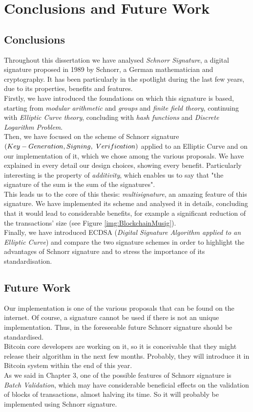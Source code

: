 \chapter{Conclusions and Future Work}
\label{capitolo6}


\section{Conclusions}
Throughout this dissertation we have analysed \textit{Schnorr Signature}, a digital signature proposed in 1989 by Schnorr, a German mathematician and cryptography. It has been particularly in the spotlight during the last few years, due to its properties, benefits and features.\\
Firstly, we have introduced the foundations on which this signature is based, starting from \textit{modular arithmetic} and \textit{groups} and \textit{finite field theory}, continuing with \textit{Elliptic Curve theory}, concluding with \textit{hash functions} and \textit{Discrete Logarithm Problem}.\\
Then, we have focused on the scheme of Schnorr signature $(Key-Generation,\\ Signing,\ Verification)$ applied to an Elliptic Curve and on our implementation of it, which we chose among the various proposals. We have explained in every detail our design choices, showing every benefit. Particularly interesting is the property of \textit{additivity}, which enables us to say that "the signature of the sum is the sum of the signatures".\\
This leads us to the core of this thesis: \textit{multisignature}, an amazing feature of this signature. We have implemented its scheme and analysed it in details, concluding that it would lead to considerable benefits, for example a significant reduction of the transactions' size (see Figure \eqref{img:BlockchainMusig}).\\
Finally, we have introduced ECDSA (\textit{Digital Signature Algorithm applied to an Elliptic Curve}) and compare the two signature schemes in order to highlight the advantages of Schnorr signature and to stress the importance of its standardisation.



\section{Future Work}
Our implementation is one of the various proposals that can be found on the internet. Of course, a signature cannot be used if there is not an unique implementation. Thus, in the foreseeable future Schnorr signature should be standardised.\\
Bitcoin core developers are working on it, so it is conceivable that they might release their algorithm in the next few months. Probably, they will introduce it in Bitcoin system within the end of this year.\\
As we said in Chapter 3, one of the possible features of Schnorr signature is \textit{Batch Validation}, which may have considerable beneficial effects on the validation of blocks of transactions, almost halving its time. So it will probably be implemented using Schnorr signature.\\
